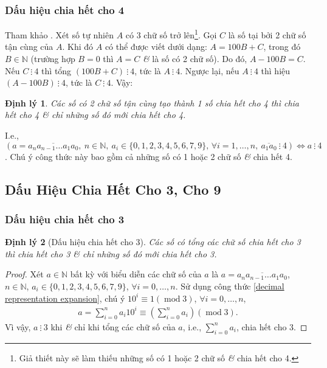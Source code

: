 \documentclass{article}
\numberwithin{equation}{section}
\newtheorem{dinhly}{Định lý}[section]
\begin{document}
\subsubsection{Dấu hiệu chia hết cho 4}
Tham khảo \cite[p. 37]{SGK_Toan_6_Canh_Dieu_tap_1}. Xét số tự nhiên $A$ có 3 chữ số trở lên\footnote{Giả thiết này sẽ làm thiếu những số có 1 hoặc 2 chữ số \textit{\&} chia hết cho 4.}. Gọi $C$ là số tại bởi 2 chữ số tận cùng của $A$. Khi đó $A$ có thể được viết dưới dạng: $A = 100B + C$, trong đó $B\in\mathbb{N}$ (trường hợp $B = 0$ thì $A = C$ \textit{\&} là số có 2 chữ số). Do đó, $A - 100B = C$. Nếu $C\ \vdots\ 4$ thì tổng $(100B + C)\ \vdots\ 4$, tức là $A\ \vdots\ 4$. Ngược lại, nếu $A\ \vdots\ 4$ thì hiệu $(A - 100B)\ \vdots\ 4$, tức là $C\ \vdots\ 4$. Vậy:

\begin{dinhly}
	Các số có 2 chữ số tận cùng tạo thành 1 số chia hết cho 4 thì chia hết cho 4 \textit{\&} chỉ những số đó mới chia hết cho 4.
\end{dinhly}
I.e., $(a = \overline{a_na_{n-1}\ldots a_1a_0},\ n\in\mathbb{N},\ a_i\in\{0,1,2,3,4,5,6,7,9\},\,\forall i = 1,\ldots,n,\ \overline{a_1a_0}\ \vdots\ 4)\Leftrightarrow a\ \vdots\ 4$. Chú ý công thức này bao gồm cả những số có 1 hoặc 2 chữ số \textit{\&} chia hết 4.


\subsection{Dấu Hiệu Chia Hết Cho 3, Cho 9}

\subsubsection{Dấu hiệu chia hết cho 3}

\begin{dinhly}[Dấu hiệu chia hết cho 3]
	Các số có tổng các chữ số chia hết cho 3 thì chia hết cho 3 \textit{\&} chỉ những số đó mới chia hết cho 3.
\end{dinhly}

\begin{proof}[Proof]
	Xét $a\in\mathbb{N}$ bất kỳ với biểu diễn các chữ số của $a$ là $a = \overline{a_na_{n-1}\ldots a_1a_0}$, $n\in\mathbb{N}$, $a_i\in\{0,1,2,3,4,5,6,7,9\}$, $\forall i = 0,\ldots,n$. Sử dụng công thức \eqref{decimal representation expansion}, chú ý $10^i\equiv 1(\operatorname{mod} 3)$, $\forall i = 0,\ldots,n$,
	\begin{align*}
		a = \sum_{i=0}^n a_i10^i\equiv\left(\sum_{i=0}^n a_i\right)(\operatorname{mod} 3).
	\end{align*}
	Vì vậy, $a\ \vdots\ 3$ khi \textit{\&} chỉ khi tổng các chữ số của $a$, i.e., $\sum_{i=0}^n a_i$, chia hết cho 3.
\end{proof}
\end{document}
